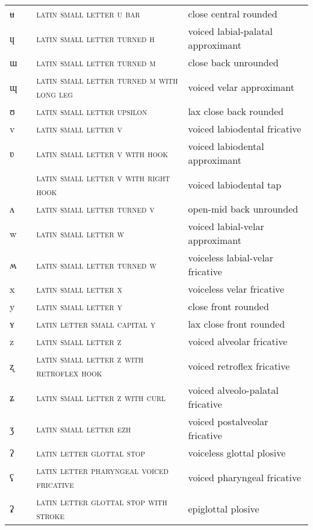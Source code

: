 \begin{center}
\begin{xtabular}{ l l L{4.5cm} L{4.5cm} }
ʉ &  & \textsc{latin small letter u bar} & close central rounded \\ 
ɥ &  & \textsc{latin small letter turned h} & voiced labial-palatal approximant \\ 
ɯ &  & \textsc{latin small letter turned m} & close back unrounded \\ 
ɰ &  & \textsc{latin small letter turned m with long leg} & voiced velar approximant \\ 
ʊ &  & \textsc{latin small letter upsilon} & lax close back rounded \\ 
v &  & \textsc{latin small letter v} & voiced labiodental fricative \\ 
ʋ &  & \textsc{latin small letter v with hook} & voiced labiodental approximant \\ 
 &  & \textsc{latin small letter v with right hook} & voiced labiodental tap \\ 
ʌ &  & \textsc{latin small letter turned v} & open-mid back unrounded \\ 
w &  & \textsc{latin small letter w} & voiced labial-velar approximant \\ 
ʍ &  & \textsc{latin small letter turned w} & voiceless labial-velar fricative \\ 
x &  & \textsc{latin small letter x} & voiceless velar fricative \\ 
y &  & \textsc{latin small letter y} & close front rounded \\ 
ʏ &  & \textsc{latin letter small capital y} & lax close front rounded \\ 
z &  & \textsc{latin small letter z} & voiced alveolar fricative \\ 
ʐ &  & \textsc{latin small letter z with retroflex hook} & voiced retroflex fricative \\ 
ʑ &  & \textsc{latin small letter z with curl} & voiced alveolo-palatal fricative \\ 
ʒ &  & \textsc{latin small letter ezh} & voiced postalveolar fricative \\ 
ʔ &  & \textsc{latin letter glottal stop} & voiceless glottal plosive \\ 
ʕ &  & \textsc{latin letter pharyngeal voiced fricative} & voiced pharyngeal fricative \\ 
ʡ &  & \textsc{latin letter glottal stop with stroke} & epiglottal plosive \\ 

\end{xtabular}
\end{center}
